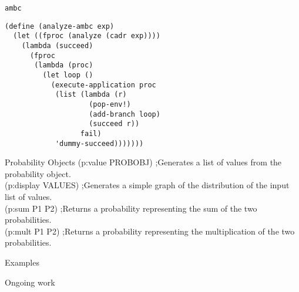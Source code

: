 \documentclass[14pt]{beamer}
\begin{document}
\begin{frame}[fragile]{\texttt{ambc}}
  \begin{lstlisting}
(define (analyze-ambc exp)
  (let ((fproc (analyze (cadr exp))))
    (lambda (succeed)
      (fproc
       (lambda (proc)
         (let loop ()     
           (execute-application proc
            (list (lambda (r)
                    (pop-env!)
                    (add-branch loop)
                    (succeed r))
                  fail)
            'dummy-succeed)))))))
  \end{lstlisting}
\end{frame}

\begin{frame}{Probability Objects}
  (p:value PROBOBJ) ;Generates a list of values from the probability object.\\
  (p:display VALUES) ;Generates a simple graph of the distribution of the input list of values.\\
  (p:sum P1 P2) ;Returns a probability representing the sum of the two probabilities.\\
  (p:mult P1 P2) ;Returns a probability representing the multiplication of the two probabilities.\\
\end{frame}

\begin{frame}{Examples}
  
\end{frame}

\begin{frame}{Ongoing work}
  
\end{frame}
\end{document}
